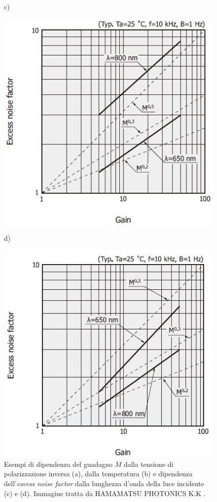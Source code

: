\begin{figure}[tbh]
\begin{minipage}{.45\textwidth}
	\end{minipage}
	c)
	\begin{minipage}{.45\textwidth}
		\includegraphics[width=\linewidth]{./ImageFiles/apd_wave1.jpg}
	\end{minipage}
	d)
	\begin{minipage}{.45\textwidth}
		\includegraphics[width=\linewidth]{./ImageFiles/apd_wave2.jpg}
	\end{minipage}
	\caption{Esempi di dipendenza del guadagno $M$ dalla tensione di polarizzazione inversa (a), dalla temperatura (b) e dipendenza dell'\textit{excess noise factor} dalla lunghezza d'onda della luce incidente (c) e (d). Immagine tratta da HAMAMATSU PHOTONICS K.K \cite{HAMAMATSU2021}.}
	\label{fig:apd_gain}
\end{figure}

